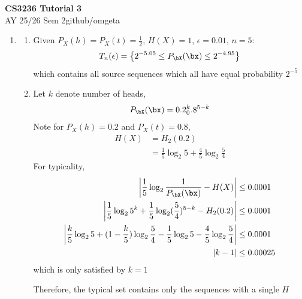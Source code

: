 \documentclass[12pt, a4paper]{article}
\newcommand{\mytitle}{CS3236 Tutorial 3}
\newcommand{\myauthor}{github/omgeta}
\newcommand{\mydate}{AY 25/26 Sem 2}
\begin{document}
\raggedright
\footnotesize
\begin{center}
{\normalsize{\textbf{\mytitle}}} \\
{\footnotesize{\mydate\hspace{2pt}\textemdash\hspace{2pt}\myauthor}}
\end{center}
\begin{enumerate}
  \item 
    \begin{enumerate}
      \item Given $P_X(h) = P_X(t) = \frac{1}{2}$, $H(X) = 1$, $\epsilon = 0.01$, $n=5$:
        \begin{align*}
          T_n(\epsilon) = \left\{ 2^{-5.05} \leq P_{\bX}(\bx) \leq 2^{-4.95} \right\}
        \end{align*}
        which contains all source sequences which all have equal probability $2^{-5}$

      \item Let $k$ denote number of heads,
        \begin{align*}
          P_{\bX}(\bx) = 0.2^k_0.8^{5 - k}
        \end{align*}
        Note for $P_X(h) = 0.2$ and $P_X(t) = 0.8$,
        \begin{align*}
          H(X) &= H_2(0.2)\\
               &= \frac{1}{5}\log_{2}5 + \frac{4}{5}\log_2 \frac{5}{4}
        \end{align*}
        For typicality,
        \begin{align*}
          \left|\frac{1}{5}\log_2 \frac{1}{P_{\bX}(\bx)} - H(X)\right| &\leq 0.0001 \\ 
          \left|\frac{1}{5}\log_2 5^k + \frac{1}{5}\log_2(\frac{5}{4})^{5-k} - H_2(0.2)\right| &\leq 0.0001\\ 
          \left|\frac{k}{5}\log_2 5 + (1-\frac{k}{5})\log_2 \frac{5}{4} - \frac{1}{5}\log_{2}5 - \frac{4}{5}\log_2 \frac{5}{4}\right| &\leq 0.0001\\ 
          \left|k-1\right| &\leq 0.00025
        \end{align*}
        which is only satisfied by $k=1$

        Therefore, the typical set contains only the sequences with a single $H$


\end{enumerate}
\end{enumerate}
\end{document}

